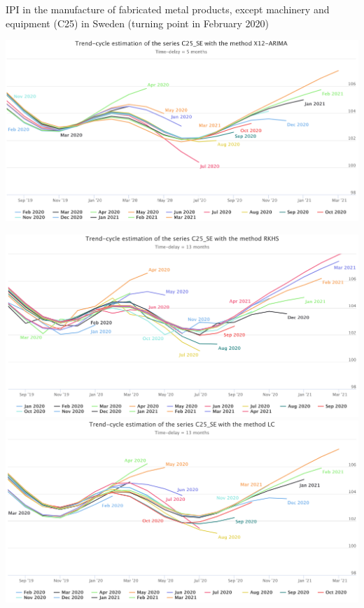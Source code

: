 \documentclass[10pt,xcolor=table,color={dvipsnames,usenames},ignorenonframetext,usepdftitle=false,english]{beamer}
\newcommand\1{\mathds{1}}
\begin{document}
\begin{frame}{IPI in the manufacture of fabricated metal products,
except machinery and equipment (C25) in Sweden (turning point in
February 2020)}
\protect\hypertarget{ipi-in-the-manufacture-of-fabricated-metal-products-except-machinery-and-equipment-c25-in-sweden-turning-point-in-february-2020}{}
\centering

\includegraphics[height = 0.5\paperheight]{img/C25SE_x13}
\end{frame}

\begin{frame}{}
\protect\hypertarget{section}{}
\centering

\includegraphics[height = 0.5\paperheight]{img/C25SE_rkhs}
\includegraphics[height = 0.5\paperheight]{img/C25SE_lc}
\end{frame}
\end{document}
